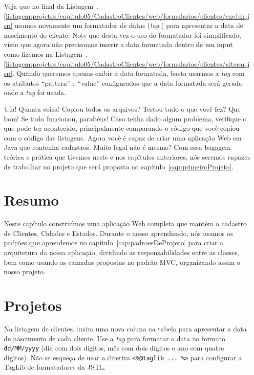 
Veja que no final da Listagem~\thechapter.\ref{listagem:projetos/capitulo05/CadastroClientes/web/formularios/clientes/excluir.jsp} usamos novamente um formatador de datas (\textit{tag} ) para apresentar a data de nascimento do cliente. Note que desta vez o uso do formatador foi simplificado, visto que agora não precisamos inserir a data formatada dentro de um input como fizemos na Listagem~\thechapter.\ref{listagem:projetos/capitulo05/CadastroClientes/web/formularios/clientes/alterar.jsp}. Quando queremos apenas exibir a data formatada, basta usarmos a \textit{tag}  com os atributos ``pattern'' e ``value'' configurados que a data formatada será gerada onde a \textit{tag} foi usada.

Ufa! Quanta coisa! Copiou todos os arquivos? Testou tudo o que você fez? Que bom! Se tudo funcionou, parabéns! Caso tenha dado algum problema, verifique o que pode ter acontecido, principalmente comparando o código que você copiou com o código das listagens. Agora você é capaz de criar uma aplicação Web em Java que contenha cadastros. Muito legal não é mesmo? Com essa bagagem teórica e prática que tivemos neste e nos capítulos anteriores, nós seremos capazes de trabalhar no projeto que será proposto no capítulo~\ref{cap:primeiroProjeto}.

\section{Resumo}

Neste capítulo construímos uma aplicação Web completa que mantém o cadastro de Clientes, Cidades e Estados. Durante o nosso aprendizado, nós usamos os padrões que aprendemos no capítulo~\ref{cap:padroesDeProjeto} para criar a arquitetura da nossa aplicação, dividindo as responsabilidades entre as classes, bem como usando as camadas propostas no padrão MVC, organizando assim o nosso projeto. 


\section{Projetos}

\begin{projetoSemArquivo}{}{}{}
    Na listagem de clientes, insira uma nova coluna na tabela para apresentar a data de nascimento de cada cliente. Use a \textit{tag}  para formatar a data no formato \texttt{dd/MM/yyyy} (dia com dois dígitos, mês com dois dígitos e ano com quatro dígitos). Não se esqueça de usar a diretiva \texttt{<\%@taglib ... \%>} para configurar a TagLib de formatadores da JSTL. 
\end{projetoSemArquivo}

